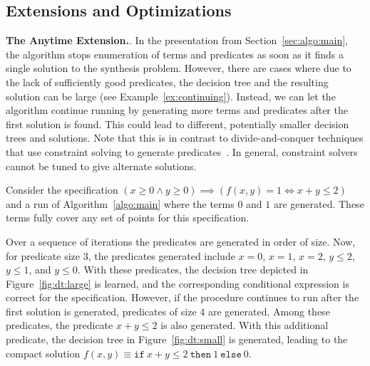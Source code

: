 \documentclass{llncs}
\newcommand\SynthFun{f}
\renewcommand{\paragraph}[1]{\par\noindent\textbf{#1}.}
\begin{document}
\subsection{Extensions and Optimizations}
\label{sec:optimizations}

\paragraph{The Anytime Extension.}
In the presentation from Section~\ref{sec:algo:main}, the algorithm
stops enumeration of terms and predicates as soon as it finds a single
solution to the synthesis problem.
However, there are cases where due to the lack of sufficiently good
predicates, the decision tree and the resulting solution can be large
(see Example~\ref{ex:continuing}).
Instead, we can let the algorithm continue running by generating more
terms and predicates after the first solution is found.
This could lead to different, potentially smaller decision trees and
solutions.
Note that this is in contrast to divide-and-conquer techniques that use
constraint solving to generate predicates~\cite{alur-15,madhusudan-16-pw}.
In general, constraint solvers cannot be tuned to give alternate
solutions.

\begin{example}
  \label{ex:continuing}
  Consider the specification $(x \geq 0 \wedge y \geq 0) \implies (\SynthFun(x, y) = 1
  \Leftrightarrow x + y \leq 2)$ and a run of Algorithm~\ref{algo:main}
  where the terms $0$ and $1$ are generated.
  These terms fully cover any set of points for this specification.

  Over a sequence of iterations the predicates are generated in order of
  size.
  Now, for predicate size $3$, the predicates generated include $x = 0$,
  $x = 1$, $x = 2$, $y \leq 2$, $y \leq 1$, and $y \leq 0$.
  With these predicates, the decision tree depicted in
  Figure~\ref{fig:dt:large} is learned, and the corresponding
  conditional expression is correct for the specification.
  However, if the procedure continues to run after the first solution is
  generated, predicates of size $4$ are generated.
  Among these predicates, the predicate $x + y \leq 2$ is also
  generated.
  With this additional predicate, the decision tree in
  Figure~\ref{fig:dt:small} is generated, leading to the compact
  solution $\SynthFun(x, y) \equiv \mathtt{if}~x + y \leq
  2~\mathtt{then}~1~\mathtt{else}~0$.
\end{example}
\end{document}
